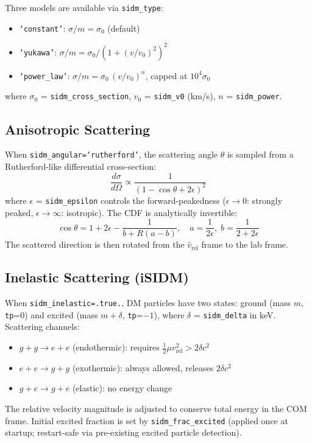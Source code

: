 \documentclass[11pt,fleqn]{book}
\begin{document}
Three models are available via \texttt{sidm\_type}:
\begin{itemize}[nosep]
  \item \texttt{`constant'}: $\sigma/m = \sigma_0$ (default)
  \item \texttt{`yukawa'}: $\sigma/m = \sigma_0 / (1 + (v/v_0)^2)^2$
  \item \texttt{`power\_law'}: $\sigma/m = \sigma_0\,(v/v_0)^n$, capped at $10^4\sigma_0$
\end{itemize}
where $\sigma_0$ = \texttt{sidm\_cross\_section}, $v_0$ = \texttt{sidm\_v0} (km/s), $n$ = \texttt{sidm\_power}.

\subsection{Anisotropic Scattering}

When \texttt{sidm\_angular=`rutherford'}, the scattering angle $\theta$ is sampled from a
Rutherford-like differential cross-section:
\[
  \frac{d\sigma}{d\Omega} \propto \frac{1}{(1-\cos\theta+2\epsilon)^2}
\]
where $\epsilon$ = \texttt{sidm\_epsilon} controls the forward-peakedness
($\epsilon\to 0$: strongly peaked, $\epsilon\to\infty$: isotropic).
The CDF is analytically invertible:
\[
  \cos\theta = 1+2\epsilon - \frac{1}{b + R(a-b)}, \quad a=\frac{1}{2\epsilon},\; b=\frac{1}{2+2\epsilon}
\]
The scattered direction is then rotated from the $\hat{v}_{\mathrm{rel}}$ frame to the lab frame.

\subsection{Inelastic Scattering (iSIDM)}

When \texttt{sidm\_inelastic=.true.}, DM particles have two states:
ground (mass $m$, \texttt{tp}=0) and excited (mass $m+\delta$, \texttt{tp}=$-1$),
where $\delta$ = \texttt{sidm\_delta} in keV.
Scattering channels:
\begin{itemize}[nosep]
  \item $g+g \to e+e$ (endothermic): requires $\tfrac{1}{2}\mu v_{\mathrm{rel}}^2 > 2\delta c^2$
  \item $e+e \to g+g$ (exothermic): always allowed, releases $2\delta c^2$
  \item $g+e \to g+e$ (elastic): no energy change
\end{itemize}
The relative velocity magnitude is adjusted to conserve total energy in the COM frame.
Initial excited fraction is set by \texttt{sidm\_frac\_excited} (applied once at startup;
restart-safe via pre-existing excited particle detection).
\end{document}
